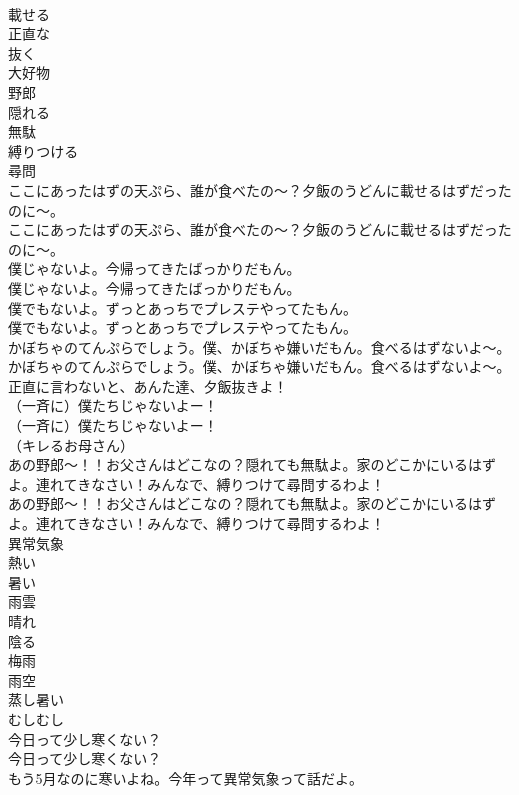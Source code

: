\documentclass[8pt]{extreport}
\begin{document}
\begin{CJK}{UTF8}{min}
\\	載せる
\\	正直な
\\	抜く
\\	大好物
\\	野郎
\\	隠れる
\\	無駄
\\	縛りつける
\\	尋問
\\	ここにあったはずの天ぷら、誰が食べたの〜？夕飯のうどんに載せるはずだったのに〜。	
\\	ここにあったはずの天ぷら、誰が食べたの〜？夕飯のうどんに載せるはずだったのに〜。 
\\	僕じゃないよ。今帰ってきたばっかりだもん。	
\\	僕じゃないよ。今帰ってきたばっかりだもん。 
\\	僕でもないよ。ずっとあっちでプレステやってたもん。	
\\	僕でもないよ。ずっとあっちでプレステやってたもん。 
\\	かぼちゃのてんぷらでしょう。僕、かぼちゃ嫌いだもん。食べるはずないよ〜。	
\\	かぼちゃのてんぷらでしょう。僕、かぼちゃ嫌いだもん。食べるはずないよ〜。 
\\	正直に言わないと、あんた達、夕飯抜きよ！	
\\	（一斉に）僕たちじゃないよー！	
\\	（一斉に）僕たちじゃないよー！ 
\\	（キレるお母さん）	
\\	あの野郎〜！！お父さんはどこなの？隠れても無駄よ。家のどこかにいるはずよ。連れてきなさい！みんなで、縛りつけて尋問するわよ！	
\\	あの野郎〜！！お父さんはどこなの？隠れても無駄よ。家のどこかにいるはずよ。連れてきなさい！みんなで、縛りつけて尋問するわよ！ 
\\	異常気象
\\	熱い
\\	暑い
\\	雨雲
\\	晴れ
\\	陰る
\\	梅雨
\\	雨空
\\	蒸し暑い
\\	むしむし
\\	今日って少し寒くない？	
\\	今日って少し寒くない？ 
\\	もう5月なのに寒いよね。今年って異常気象って話だよ。	

\end{CJK}
\end{document}
